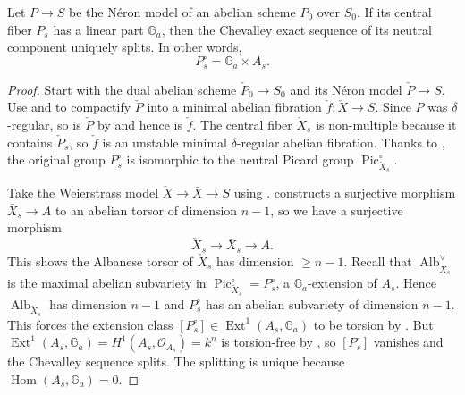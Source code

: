 \documentclass[reqno, letterpaper]{amsart}
\numberwithin{equation}{subsection}
\let\to\longrightarrow
\newcommand{\GG}{\mathbb{G}}
\DeclareMathOperator{\Hom}{Hom}
\DeclareMathOperator{\Ext}{Ext}
\DeclareMathOperator{\Pic}{Pic}
\DeclareMathOperator{\Alb}{Alb}
\begin{document}
		\begin{theorem} \label{thm:splitting}
			Let $P \to S$ be the N\'eron model of an abelian scheme $P_0$ over $S_0$. If its central fiber $P_s$ has a linear part $\GG_a$, then the Chevalley exact sequence of its neutral component uniquely splits. In other words,
			\[ P^\circ_s = \GG_a \times A_s .\]
		\end{theorem}
		\begin{proof}
			Start with the dual abelian scheme $\check P_0 \to S_0$ and its N\'eron model $\check P \to S$. Use  and  to compactify $\check P$ into a minimal abelian fibration $\check f : \check X \to S$. Since $P$ was $\delta$-regular, so is $\check P$ by  and hence is $\check f$. The central fiber $\check X_s$ is non-multiple because it contains $\check P_s$, so $\check f$ is an unstable minimal $\delta$-regular abelian fibration. Thanks to , the original group $P^\circ_s$ is isomorphic to the neutral Picard group $\Pic^\circ_{\check X_s}$.
			
			\medskip
			
			Take the Weierstrass model $\check X \to \bar X \to S$ using .  constructs a surjective morphism $\bar X_s \to A$ to an abelian torsor of dimension $n-1$, so we have a surjective morphism
			\[ \check X_s \to \bar X_s \to A .\]
			This shows the Albanese torsor of $\check X_s$ has dimension $\ge n-1$. Recall that $\Alb_{\check X_s}^\vee$ is the maximal abelian subvariety in $\Pic^\circ_{\check X_s} = P^\circ_s$, a $\GG_a$-extension of $A_s$. Hence $\Alb_{\check X_s}$ has dimension $n-1$ and $P^\circ_s$ has an abelian subvariety of dimension $n-1$. This forces the extension class $[P^\circ_s] \in \Ext^1 (A_s, \GG_a)$ to be torsion by \cite[Lemma~1(b)]{mat-miy66}. But $\Ext^1 (A_s, \GG_a) = H^1 (A_s, \mathcal O_{A_s}) = k^n$ is torsion-free by \cite[\S VII.3.17]{serre:class_field}, so $[P^\circ_s]$ vanishes and the Chevalley sequence splits. The splitting is unique because $\Hom(A_s, \GG_a) = 0$.
		\end{proof}
		
\end{document}
